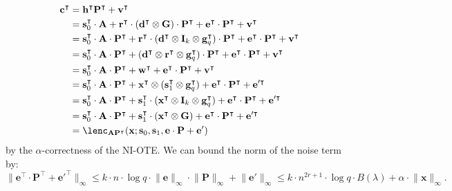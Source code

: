 \documentclass{article}
\newcommand{\id}{\ensuremath{\mathbf{I}}}
\begin{document}
    \begin{align*}\mathbf{c}^\intercal&=\mathbf{h}^\intercal \mathbf{P}^\intercal+\mathbf{v}^\intercal\\
    &=\mathbf{s}_0^\intercal\cdot \mathbf{A}+\mathbf{r}^\intercal\cdot(\mathbf{d}^\intercal \otimes \mathbf{G})\cdot \mathbf{P}^\intercal+\mathbf{e}^\intercal\cdot \mathbf{P}^\intercal+\mathbf{v}^\intercal\\
    &=\mathbf{s}_0^\intercal\cdot \mathbf{A}\cdot \mathbf{P}^\intercal+\mathbf{r}^\intercal\cdot (\mathbf{d}^\intercal \otimes \id_k\otimes \mathbf{g}_q^\intercal)\cdot \mathbf{P}^\intercal+\mathbf{e}^\intercal\cdot \mathbf{P}^\intercal+\mathbf{v}^\intercal\\
    &=\mathbf{s}_0^\intercal\cdot \mathbf{A}\cdot \mathbf{P}^\intercal+(\mathbf{d}^\intercal \otimes \mathbf{r}^\intercal\otimes \mathbf{g}_q^\intercal)\cdot \mathbf{P}^\intercal+\mathbf{e}^\intercal\cdot \mathbf{P}^\intercal+\mathbf{v}^\intercal\\
    &=\mathbf{s}_0^\intercal\cdot \mathbf{A}\cdot \mathbf{P}^\intercal+{\mathbf{w}}^\intercal+\mathbf{e}^\intercal\cdot \mathbf{P}^\intercal+\mathbf{v}^\intercal\\
    &=\mathbf{s}_0^\intercal\cdot \mathbf{A}\cdot \mathbf{P}^\intercal+\mathbf{x}^\intercal\otimes (\mathbf{s}_1^\intercal\otimes \mathbf{g}_q^\intercal)+\mathbf{e}^\intercal\cdot \mathbf{P}^\intercal+\mathbf{e}'^\intercal\\
        &=\mathbf{s}_0^\intercal\cdot \mathbf{A}\cdot \mathbf{P}^\intercal+\mathbf{s}_1^\intercal\cdot (\mathbf{x}^\intercal\otimes\id_k\otimes \mathbf{g}_q^\intercal)+\mathbf{e}^\intercal\cdot \mathbf{P}^\intercal+\mathbf{e}'^\intercal\\
    &=\mathbf{s}_0^\intercal\cdot \mathbf{A}\cdot \mathbf{P}^\intercal+\mathbf{s}_1^\intercal\cdot (\mathbf{x}^\intercal\otimes \mathbf{G})+\mathbf{e}^\intercal\cdot \mathbf{P}^\intercal+\mathbf{e}'^\intercal\\
    &= \lenc_{\mathbf{A}\mathbf{P}^\intercal}(\mathbf{x}; \mathbf{s}_0, \mathbf{s}_1, \mathbf{e}\cdot \mathbf{P}+\mathbf{e}')
    \end{align*}
by the $\alpha$-correctness of the NI-OTE. We can bound the norm of the noise term by:
\[\lVert \mathbf{e}^\intercal\cdot \mathbf{P}^\intercal+\mathbf{e}'^\intercal\rVert_\infty\le k\cdot n\cdot \log q\cdot \lVert \mathbf{e}\rVert_\infty\cdot \lVert \mathbf{P}\rVert_\infty+\lVert \mathbf{e}'\rVert_\infty \le k\cdot n^{2r + 1}\cdot \log q\cdot B(\lambda) + \alpha \cdot\lVert\mathbf{x}\rVert_\infty.
\] 
\end{document}
